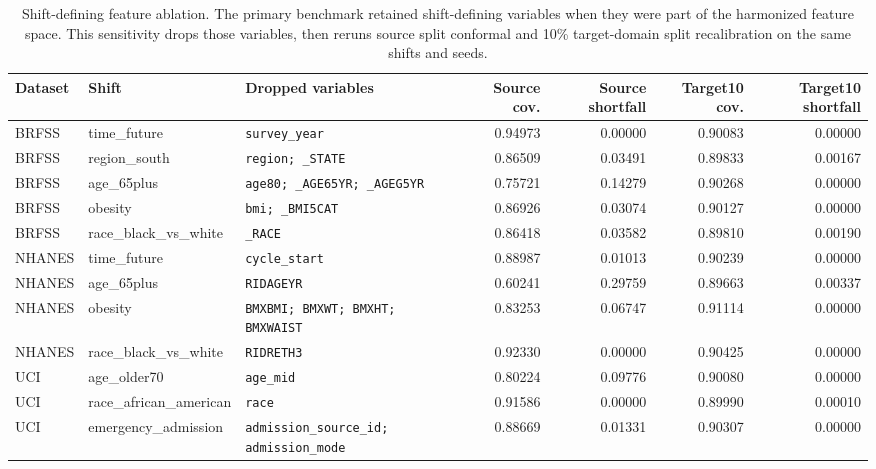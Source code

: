 \begin{table}[!tbp]
\centering
\caption{Shift-defining feature ablation. The primary benchmark retained shift-defining variables when they were part of the harmonized feature space. This sensitivity drops those variables, then reruns source split conformal and 10\% target-domain split recalibration on the same shifts and seeds.}
\label{primary-tab:shift_defining_feature_ablation}
\scriptsize
\setlength{\tabcolsep}{2.5pt}
\renewcommand{\arraystretch}{1.08}
\begin{tabularx}{\textwidth}{@{}L{1.35cm}L{2.55cm}Yrrrr@{}}
\toprule
Dataset & Shift & Dropped variables & Source cov. & Source shortfall & Target10 cov. & Target10 shortfall \\
\midrule
BRFSS & time\_future & \texttt{survey\_year} & 0.94973 & 0.00000 & 0.90083 & 0.00000 \\
BRFSS & region\_south & \texttt{region; \_STATE} & 0.86509 & 0.03491 & 0.89833 & 0.00167 \\
BRFSS & age\_65plus & \texttt{age80; \_AGE65YR; \_AGEG5YR} & 0.75721 & 0.14279 & 0.90268 & 0.00000 \\
BRFSS & obesity & \texttt{bmi; \_BMI5CAT} & 0.86926 & 0.03074 & 0.90127 & 0.00000 \\
BRFSS & race\_black\_vs\_white & \texttt{\_RACE} & 0.86418 & 0.03582 & 0.89810 & 0.00190 \\
NHANES & time\_future & \texttt{cycle\_start} & 0.88987 & 0.01013 & 0.90239 & 0.00000 \\
NHANES & age\_65plus & \texttt{RIDAGEYR} & 0.60241 & 0.29759 & 0.89663 & 0.00337 \\
NHANES & obesity & \texttt{BMXBMI; BMXWT; BMXHT; BMXWAIST} & 0.83253 & 0.06747 & 0.91114 & 0.00000 \\
NHANES & race\_black\_vs\_white & \texttt{RIDRETH3} & 0.92330 & 0.00000 & 0.90425 & 0.00000 \\
UCI & age\_older70 & \texttt{age\_mid} & 0.80224 & 0.09776 & 0.90080 & 0.00000 \\
UCI & race\_african\_american & \texttt{race} & 0.91586 & 0.00000 & 0.89990 & 0.00010 \\
UCI & emergency\_admission & \texttt{admission\_source\_id; admission\_mode} & 0.88669 & 0.01331 & 0.90307 & 0.00000 \\
\bottomrule
\end{tabularx}
\end{table}
